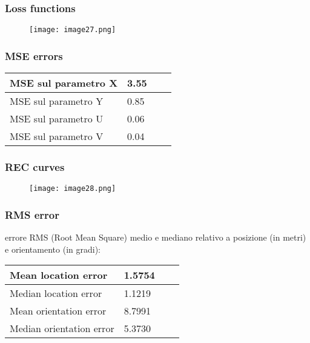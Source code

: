 \subsubsection{Loss functions}
\begin{figure}[H]
	\centering
	\texttt{[image: image27.png]}
\end{figure}

\subsubsection{MSE errors}
\begin{center}
	\begin{tabular}{| l | l | l | l |}
		\hline
		MSE sul parametro X & 3.55 \\ \hline
		MSE sul parametro Y & 0.85 \\ \hline
		MSE sul parametro U & 0.06 \\ \hline
		MSE sul parametro V & 0.04 \\ \hline							
	\end{tabular}
\end{center}

\subsubsection{REC curves}
\begin{figure}[H]
	\centering
	\texttt{[image: image28.png]}
\end{figure}

\subsubsection{RMS error}
errore RMS (Root Mean Square) medio e mediano relativo a posizione (in metri) e orientamento (in gradi):
\begin{center}
	\begin{tabular}{| l | l | l | l |}
		\hline
		Mean location error & 1.5754 \\ \hline
		Median location error & 1.1219 \\ \hline
		Mean orientation error & 8.7991 \\ \hline
		Median orientation error & 5.3730 \\ \hline							
	\end{tabular}
\end{center}
